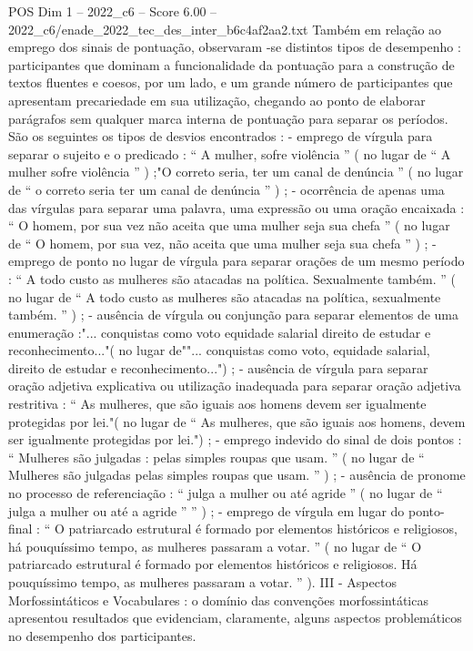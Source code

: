 \begin{textsample}{POS Dim 1 – 2022\_c6 – Score 6.00 – 2022\_c6/enade\_2022\_tec\_des\_inter\_b6c4af2aa2.txt}
Também em relação ao emprego dos sinais de pontuação, observaram -se distintos tipos de desempenho : participantes que dominam a funcionalidade da pontuação para a construção de textos fluentes e coesos, por um lado, e um grande número de participantes que apresentam precariedade em sua utilização, chegando ao ponto de elaborar parágrafos sem qualquer marca interna de pontuação para separar os períodos.
São os seguintes os tipos de desvios encontrados : - emprego de vírgula para separar o sujeito e o predicado : “ A mulher, sofre violência ” ( no lugar de “ A mulher sofre violência ” ) ;"O correto seria, ter um canal de denúncia ” ( no lugar de “ o correto seria ter um canal de denúncia ” ) ; - ocorrência de apenas uma das vírgulas para separar uma palavra, uma expressão ou uma oração encaixada : “ O homem, por sua vez não aceita que uma mulher seja sua chefa ” ( no lugar de “ O homem, por sua vez, não aceita que uma mulher seja sua chefa ” ) ; - emprego de ponto no lugar de vírgula para separar orações de um mesmo período : “ A todo custo as mulheres são atacadas na política.
Sexualmente também. ” ( no lugar de “ A todo custo as mulheres são atacadas na política, sexualmente também. ” ) ; - ausência de vírgula ou conjunção para separar elementos de uma enumeração :"... conquistas como voto equidade salarial direito de estudar e reconhecimento..."( no lugar de""... conquistas como voto, equidade salarial, direito de estudar e reconhecimento...") ; - ausência de vírgula para separar oração adjetiva explicativa ou utilização inadequada para separar oração adjetiva restritiva : “ As mulheres, que são iguais aos homens devem ser igualmente protegidas por lei."( no lugar de “ As mulheres, que são iguais aos homens, devem ser igualmente protegidas por lei.") ; - emprego indevido do sinal de dois pontos : “ Mulheres são julgadas : pelas simples roupas que usam. ” ( no lugar de “ Mulheres são julgadas pelas simples roupas que usam. ” ) ; - ausência de pronome no processo de referenciação : “ julga a mulher ou até agride ” ( no lugar de “ julga a mulher ou até a agride ” ” ) ; - emprego de vírgula em lugar do ponto-final : “ O patriarcado estrutural é formado por elementos históricos e religiosos, há pouquíssimo tempo, as mulheres passaram a votar. ” ( no lugar de “ O patriarcado estrutural é formado por elementos históricos e religiosos.
Há pouquíssimo tempo, as mulheres passaram a votar. ” ).
III - Aspectos Morfossintáticos e Vocabulares : o domínio das convenções morfossintáticas apresentou resultados que evidenciam, claramente, alguns aspectos problemáticos no desempenho dos participantes.

\end{textsample}
